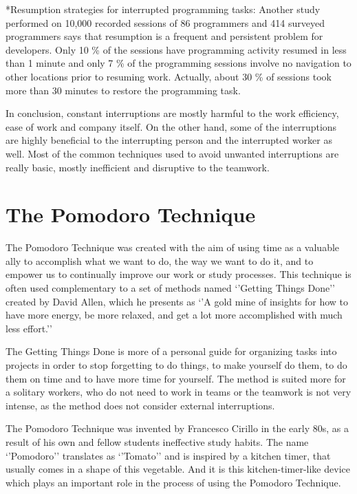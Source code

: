 \documentclass[11pt,singleside]{myfithesis2}
\makeatletter
\renewcommand\paragraph{
   \vspace{-10pt}
   \@startsection{paragraph}{4}{0mm}
      {\baselineskip}
      {- 5pt}
      {\normalfont\normalsize\bfseries}
}
\makeatother
\begin{document}
\paragraph*{Resumption strategies for interrupted programming tasks: } Another study \cite{studyResumptionStrategies} performed on 10,000 recorded sessions of 86 programmers and 414 surveyed programmers says that resumption is a frequent and persistent problem for developers. Only 10 \% of the sessions have programming activity resumed in less than 1 minute and only 7 \% of the programming sessions involve no navigation to other locations prior to resuming work. Actually, about 30 \% of sessions took more than 30 minutes to restore the programming task.

In conclusion, constant interruptions are mostly harmful to the work efficiency, ease of work and company itself. On the other hand, some of the interruptions are highly beneficial to the interrupting person and the interrupted worker as well. Most of the common techniques used to avoid unwanted interruptions are really basic, mostly inefficient and disruptive to the teamwork.

	\section{The Pomodoro Technique}
The Pomodoro Technique \cite{pomodoro} was created with the aim of using time as a valuable ally to accomplish what we want to do, the way we want to do it, and to empower us to continually improve our work or study processes. This technique is often used complementary to a set of methods named `'Getting Things Done'' \cite{gtd} created by David Allen, which he presents as `'A gold mine of insights for how to have more energy, be more relaxed, and get a lot more accomplished with much less effort.''

The Getting Things Done is more of a personal guide for organizing tasks into projects in order to stop forgetting to do things, to make yourself do them, to do them on time and to have more time for yourself. The method is suited more for a solitary workers, who do not need to work in teams or the teamwork is not very intense, as the method does not consider external interruptions.

The Pomodoro Technique was invented by Francesco Cirillo in the early 80s, as a result of his own and fellow students ineffective study habits. The name `'Pomodoro'' translates as `'Tomato'' and is inspired by a kitchen timer, that usually comes in a shape of this vegetable. And it is this kitchen-timer-like device which plays an important role in the process of using the Pomodoro Technique.
\end{document}
